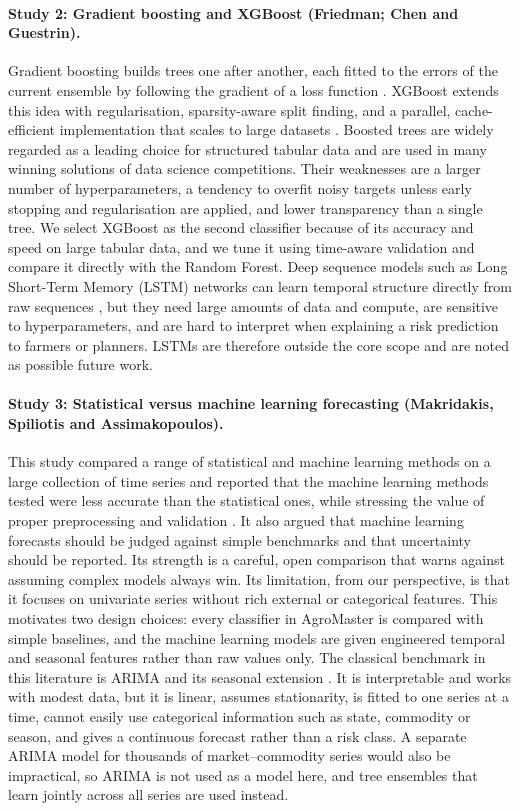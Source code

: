 \documentclass[12pt,a4paper]{article}
\begin{document}
\paragraph{Study 2: Gradient boosting and XGBoost (Friedman; Chen and Guestrin).}
Gradient boosting builds trees one after another, each fitted to the errors of the current ensemble by following the gradient of a loss function \cite{friedman2001greedy}. XGBoost extends this idea with regularisation, sparsity-aware split finding, and a parallel, cache-efficient implementation that scales to large datasets \cite{chen2016xgboost}. Boosted trees are widely regarded as a leading choice for structured tabular data and are used in many winning solutions of data science competitions. Their weaknesses are a larger number of hyperparameters, a tendency to overfit noisy targets unless early stopping and regularisation are applied, and lower transparency than a single tree. We select XGBoost as the second classifier because of its accuracy and speed on large tabular data, and we tune it using time-aware validation and compare it directly with the Random Forest. Deep sequence models such as Long Short-Term Memory (LSTM) networks can learn temporal structure directly from raw sequences \cite{hochreiter1997long}, but they need large amounts of data and compute, are sensitive to hyperparameters, and are hard to interpret when explaining a risk prediction to farmers or planners. LSTMs are therefore outside the core scope and are noted as possible future work.

\paragraph{Study 3: Statistical versus machine learning forecasting (Makridakis, Spiliotis and Assimakopoulos).}
This study compared a range of statistical and machine learning methods on a large collection of time series and reported that the machine learning methods tested were less accurate than the statistical ones, while stressing the value of proper preprocessing and validation \cite{makridakis2018statistical}. It also argued that machine learning forecasts should be judged against simple benchmarks and that uncertainty should be reported. Its strength is a careful, open comparison that warns against assuming complex models always win. Its limitation, from our perspective, is that it focuses on univariate series without rich external or categorical features. This motivates two design choices: every classifier in AgroMaster is compared with simple baselines, and the machine learning models are given engineered temporal and seasonal features rather than raw values only. The classical benchmark in this literature is ARIMA and its seasonal extension \cite{box2008time}. It is interpretable and works with modest data, but it is linear, assumes stationarity, is fitted to one series at a time, cannot easily use categorical information such as state, commodity or season, and gives a continuous forecast rather than a risk class. A separate ARIMA model for thousands of market--commodity series would also be impractical, so ARIMA is not used as a model here, and tree ensembles that learn jointly across all series are used instead.
\end{document}
